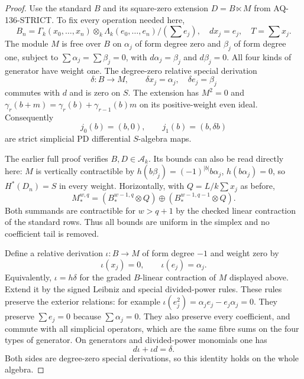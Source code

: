 \begin{proof}
Use the standard $B$ and its square-zero extension $D=B\ltimes M$
from AQ-136-STRICT. To fix every operation needed here,
\[
 B_n=\Gamma_k(x_0,\ldots,x_n)\otimes_k
       \Lambda_k(e_0,\ldots,e_n)/(\textstyle\sum e_j),
 \quad dx_j=e_j,\quad T=\textstyle\sum x_j .                \tag{136.PL2}
\]
The module $M$ is free over $B$ on $\alpha_j$ of form degree
zero and $\beta_j$ of form degree one, subject to
$\sum\alpha_j=\sum\beta_j=0$, with
$d\alpha_j=\beta_j$ and $d\beta_j=0$.
All four kinds of generator have weight one.
The degree-zero relative special derivation
\[
 \delta:B\longrightarrow M,\qquad
 \delta x_j=\alpha_j,\quad\delta e_j=\beta_j               \tag{136.PL3}
\]
commutes with $d$ and is zero on $S$.
The extension has $M^2=0$ and
$\gamma_r(b+m)=\gamma_r(b)+\gamma_{r-1}(b)m$ on its
positive-weight even ideal. Consequently
\[
       j_0(b)=(b,0),\qquad j_1(b)=(b,\delta b)              \tag{136.PL4}
\]
are strict simplicial PD differential $S$-algebra maps.

The earlier full proof verifies $B,D\in\mathcal A_k$.
Its bounds can also be read directly here: $M$ is vertically
contractible by
$h(b\beta_j)=(-1)^{|b|}b\alpha_j$, $h(b\alpha_j)=0$,
so $H^*(D_n)=S$ in every weight. Horizontally, with
$Q=L/k\sum x_j$ as before,
\[
 M_*^{w,q}=(B_*^{w-1,q}\otimes Q)
                 \oplus(B_*^{w-1,q-1}\otimes Q).
\]
Both summands are contractible for $w>q+1$ by the checked
linear contraction of the standard rows. Thus all bounds
are uniform in the simplex and no coefficient tail is removed.

Define a relative derivation $\iota:B\to M$ of form degree
$-1$ and weight zero by
\[
                  \iota(x_j)=0,\qquad\iota(e_j)=\alpha_j.
                                                               \tag{136.PL5}
\]
Equivalently, $\iota=h\delta$ for the graded $B$-linear
contraction of $M$ displayed above. Extend it by the signed
Leibniz and special divided-power rules. These rules preserve the exterior relations: for
example $\iota(e_j^2)=\alpha_je_j-e_j\alpha_j=0$.
They preserve $\sum e_j=0$ because $\sum\alpha_j=0$.
They also preserve every coefficient, and commute with all
simplicial operators, which are the same fibre sums on the
four types of generator. On generators and divided-power
monomials one has
\[
                           d\iota+\iota d=\delta.          \tag{136.PL6}
\]
Both sides are degree-zero special derivations, so this
identity holds on the whole algebra.


\end{proof}
